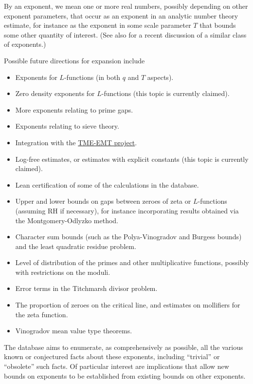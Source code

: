 By an exponent, we mean one or more real numbers, possibly depending on other exponent parameters, that occur as an exponent in an analytic number theory estimate, for instance as the exponent in some scale parameter $T$ that bounds some other quantity of interest. (See also \cite{elliott-antaaa} for a recent discussion of a similar class of exponents.)

Possible future directions for expansion include
\begin{itemize}
    \item Exponents for $L$-functions (in both $q$ and $T$ aspects).
    \item Zero density exponents for $L$-functions (this topic is currently claimed).
    \item More exponents relating to prime gaps.
    \item Exponents relating to sieve theory.
    \item Integration with the \href{https://tmeemt.github.io/Chest/}{TME-EMT project}.
    \item Log-free estimates, or estimates with explicit constants (this topic is currently claimed).
    \item Lean certification of some of the calculations in the database.
    \item Upper and lower bounds on gaps between zeroes of zeta or $L$-functions (assuming RH if necessary), for instance incorporating results obtained via the Montgomery-Odlyzko method.
    \item Character sum bounds (such as the Polya-Vinogradov and Burgess bounds) and the least quadratic residue problem.
    \item Level of distribution of the primes and other multiplicative functions, possibly with restrictions on the moduli.
    \item Error terms in the Titchmarsh divisor problem.
    \item The proportion of zeroes on the critical line, and estimates on mollifiers for the zeta function.
    \item Vinogradov mean value type theorems.
\end{itemize}

The database aims to enumerate, as comprehensively as possible, all the various known or conjectured facts about these exponents, including ``trivial'' or ``obsolete'' such facts.  Of particular interest are implications that allow new bounds on exponents to be established from existing bounds on other exponents.

